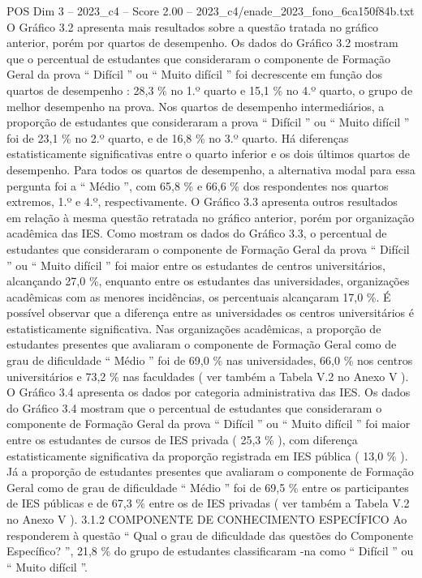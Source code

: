 \begin{textsample}{POS Dim 3 – 2023\_c4 – Score 2.00 – 2023\_c4/enade\_2023\_fono\_6ca150f84b.txt}
O Gráfico 3.2 apresenta mais resultados sobre a questão tratada no gráfico anterior, porém por quartos de desempenho.
Os dados do Gráfico 3.2 mostram que o percentual de estudantes que consideraram o componente de Formação Geral da prova “ Difícil ” ou “ Muito difícil ” foi decrescente em função dos quartos de desempenho : 28,3 \% no 1.º quarto e 15,1 \% no 4.º quarto, o grupo de melhor desempenho na prova.
Nos quartos de desempenho intermediários, a proporção de estudantes que consideraram a prova “ Difícil ” ou “ Muito difícil ” foi de 23,1 \% no 2.º quarto, e de 16,8 \% no 3.º quarto.
Há diferenças estatisticamente significativas entre o quarto inferior e os dois últimos quartos de desempenho.
Para todos os quartos de desempenho, a alternativa modal para essa pergunta foi a “ Médio ”, com 65,8 \% e 66,6 \% dos respondentes nos quartos extremos, 1.º e 4.º, respectivamente.
O Gráfico 3.3 apresenta outros resultados em relação à mesma questão retratada no gráfico anterior, porém por organização acadêmica das IES.
Como mostram os dados do Gráfico 3.3, o percentual de estudantes que consideraram o componente de Formação Geral da prova “ Difícil ” ou “ Muito difícil ” foi maior entre os estudantes de centros universitários, alcançando 27,0 \%, enquanto entre os estudantes das universidades, organizações acadêmicas com as menores incidências, os percentuais alcançaram 17,0 \%.
É possível observar que a diferença entre as universidades os centros universitários é estatisticamente significativa.
Nas organizações acadêmicas, a proporção de estudantes presentes que avaliaram o componente de Formação Geral como de grau de dificuldade “ Médio ” foi de 69,0 \% nas universidades, 66,0 \% nos centros universitários e 73,2 \% nas faculdades ( ver também a Tabela V.2 no Anexo V ).
O Gráfico 3.4 apresenta os dados por categoria administrativa das IES.
Os dados do Gráfico 3.4 mostram que o percentual de estudantes que consideraram o componente de Formação Geral da prova “ Difícil ” ou “ Muito difícil ” foi maior entre os estudantes de cursos de IES privada ( 25,3 \% ), com diferença estatisticamente significativa da proporção registrada em IES pública ( 13,0 \% ).
Já a proporção de estudantes presentes que avaliaram o componente de Formação Geral como de grau de dificuldade “ Médio ” foi de 69,5 \% entre os participantes de IES públicas e de 67,3 \% entre os de IES privadas ( ver também a Tabela V.2 no Anexo V ). 3.1.2 COMPONENTE DE CONHECIMENTO ESPECÍFICO Ao responderem à questão “ Qual o grau de dificuldade das questões do Componente Específico? ”, 21,8 \% do grupo de estudantes classificaram -na como “ Difícil ” ou “ Muito difícil ”.

\end{textsample}
